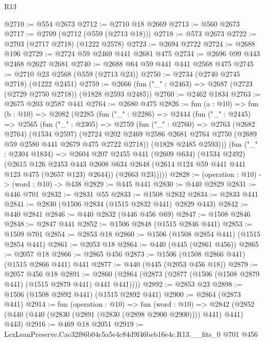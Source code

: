 \begin{lexlean}{R13}
\begin{coremodule}
@2710 := @554 @2673
@2712 := @2710 @18 @2669
@2713 := @560 @2673
@2717 := @2709 (@2712 (@559 (@2713 @18)))
@2718 := @573 @2673
@2722 := @2703 (@2717 @2718) (@1222 @2578)
@2723 := @2694 @2722
@2724 := @2688 @196
@2729 := @2724 @59 @2469 @441 @2681 @475
@2734 := @2696 @99 @443 @2468 @2627 @2681
@2740 := @2688 @64 @59 @441 @441 @2568 @475
@2745 := @2710 @23 @2568 (@559 (@2713 @23))
@2750 := @2734 (@2740 @2745 @2718) (@1222 @2451)
@2759 := @2666 (fun ("_" : @2463) => @2687 (@2723 (@2729 @2750 @2718)) (@1828 @2593 @2485))
@2760 := @2462 @1834
@2763 := @2675 @203 @2587 @441
@2764 := @2680 @475
@2826 := fun (a : @10) =>
  fun (b : @10) =>
  @2082
    (@2285
      (fun ("_" : @2286) =>
      @2444
        (fun ("_" : @2445) =>
        @2565
          (fun ("_" : @2305) =>
          @2759
            (fun ("_" : @2760) =>
            @2763
              (@2682 @2764)
              (@1534 @2597)
              (@2724
                @202
                @2469
                @2586
                @2681
                @2764
                @2750
                (@2689 @59 @2580 @441 @2679 @475 @2722 @2718))
              (@1828 @2485 @2593)))
          (fun ("_" : @2304 @1834) =>
          @2604
            @207
            @2455
            @441
            (@2609 @634)
            (@1534 @2492)
            (@2615
              @126
              @2453
              @443
              @2608
              @634
              @2648
              (@2614 @124 @59 @441 @441 @123 @475 (@2657 @123) @2644))
            (@2663 @23)))))
@2828 := (operation : @10) -> (word : @10) -> @438
@2829 := @445 @441
@2830 := @440 @2829
@2831 := @446 @701
@2832 := @2831 @55
@2833 := @1508 @2832
@2834 := @2833 @441
@2841 := @2830 (@1506 @2834 (@1515 @2832 @441) @2829 @443)
@2842 := @440 @2841
@2846 := @440 @2832 (@446 @456 @69)
@2847 := @1508 @2846
@2848 := @2847 @441
@2852 := @1506 @2848 (@1515 @2846 @441)
@2853 := @1509 @701
@2854 := @2853 @18
@2860 := @1506 (@1508 @2854 @441) (@1515 @2854 @441)
@2861 := @2053 @18
@2864 := @440 (@445 (@2861 @456))
@2865 := @2057 @18
@2866 := @2865 @456
@2873 := @1506 (@1508 @2866 @441) (@1515 @2866 @441) @441
@2877 := @440 (@445 (@2053 @456 @18))
@2879 := @2057 @456 @18
@2891 := @2860 (@2864 (@2873 (@2877 (@1506 (@1508 @2879 @441) (@1515 @2879 @441) @441 @441))))
@2892 := @2853 @23
@2898 := @1506 (@1508 @2892 @441) (@1515 @2892 @441)
@2900 := @2864 (@2873 @441)
@2914 := fun (operation : @10) =>
  fun (word : @10) =>
  @2842 (@2852 (@440 (@440 (@2830 (@2891 (@2830 (@2898 @2900 @2900)))) @441) @441) @443)
@2916 := @469 @18 @2051
@2919 := LexLeanPreserve.Cac32f86b04c5a5e4c84d9f46beb16e4c.R13.__fits_0 @701 @456

\end{coremodule}
\end{lexlean}
